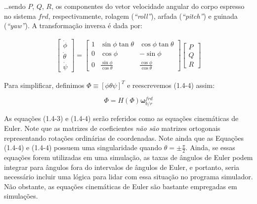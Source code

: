 \ldots sendo \(P\), \(Q\), \(R\), os componentes do vetor velocidade angular do corpo espresso no sistema \(frd\), respectivamente, rolagem (\emph{``roll''}), arfada (\emph{``pitch''}) e guinada (\emph{``yaw''}). A transformação inversa é dada por:

\begin{align} \tag{1.4-4}
    \begin{bmatrix}
        \dot\phi \\
        \dot\theta \\
        \dot\psi
    \end{bmatrix}
    =
    \begin{bmatrix}
        1 & \sin{\phi}\tan{\theta} & \cos{\phi}\tan{\theta} \\
        0 & \cos{\phi} & -\sin{\phi} \\
        0 & \frac{\sin{\phi}}{\cos{\theta}} & \frac{\cos{\phi}}{\cos{\theta}}
    \end{bmatrix}
    \begin{bmatrix}
        P \\ Q \\ R
    \end{bmatrix}
\end{align}

Para simplificar, definimos \(\Phi \equiv \left[\phi \theta \psi \right]^T \) e reescrevemos  (1.4-4) assim:

\begin{equation} \tag{1.4-5}
    \Phi = H \left( \Phi \right) \mathbf{\omega}^{frd}_{b/r}
\end{equation}

As equações (1.4-3) e (1.4-4) serão referidos como as equações cinemáticas de Euler. Note que as matrizes de coeficientes \emph{não são} matrizes ortogonais representando rotações ordinárias de coordenadas. Note ainda que as Equações (1.4-4) e (1.4-4) possuem uma singularidade quando  \(\theta = \pm \frac{\pi}{2}\). Ainda, se essas equações forem utilizadas em uma simulação, as taxas de ângulos de Euler podem integrar para ângulos fora do intervalos de ângulos de Euler, e portanto, seria necessário incluir uma lógica para lidar com essa situação no programa simulador. Não obstante, as equações cinemáticas de Euler são bastante empregadas em simulações.

